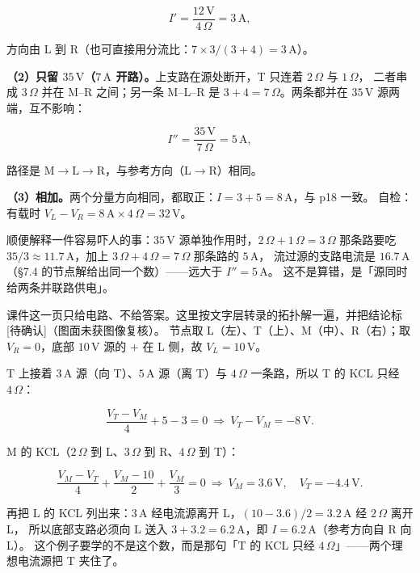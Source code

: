 \documentclass[11pt]{ctexart}
\begin{document}
\[ I'=\frac{12\,\mathrm{V}}{4\,\Omega}=3\,\mathrm{A} , \]

方向由 L 到 R（也可直接用分流比：$7\times3/(3+4)=3\,\mathrm{A}$）。

\textbf{（2）只留 $35\,\mathrm{V}$（$7\,\mathrm{A}$ 开路）。}上支路在源处断开，T 只连着 $2\,\Omega$ 与 $1\,\Omega$，
二者串成 $3\,\Omega$ 并在 M--R 之间；另一条 M--L--R 是 $3+4=7\,\Omega$。两条都并在 $35\,\mathrm{V}$ 源两端，互不影响：

\[ I''=\frac{35\,\mathrm{V}}{7\,\Omega}=5\,\mathrm{A} , \]

路径是 M$\to$L$\to$R，与参考方向（L$\to$R）相同。

\textbf{（3）相加。}两个分量方向相同，都取正：$I=3+5=8\,\mathrm{A}$，与 p18 一致。
自检：有载时 $V_L-V_R=8\,\mathrm{A}\times4\,\Omega=32\,\mathrm{V}$。

顺便解释一件容易吓人的事：$35\,\mathrm{V}$ 源单独作用时，$2\,\Omega+1\,\Omega=3\,\Omega$ 那条路要吃
$35/3\approx11.7\,\mathrm{A}$，加上 $3\,\Omega+4\,\Omega=7\,\Omega$ 那条路的 $5\,\mathrm{A}$，
流过源的支路电流是 $16.7\,\mathrm{A}$（§7.4 的节点解给出同一个数）——远大于 $I''=5\,\mathrm{A}$。
这不是算错，是「源同时给两条并联路供电」。


课件这一页只给电路、不给答案。这里按文字层转录的拓扑解一遍，并把结论标 [待确认]（图面未获图像复核）。
节点取 L（左）、T（上）、M（中）、R（右）；取 $V_R=0$，底部 $10\,\mathrm{V}$ 源的 $+$ 在 L 侧，故 $V_L=10\,\mathrm{V}$。

T 上接着 $3\,\mathrm{A}$ 源（向 T）、$5\,\mathrm{A}$ 源（离 T）与 $4\,\Omega$ 一条路，所以 T 的 KCL 只经 $4\,\Omega$：

\[ \frac{V_T-V_M}{4}+5-3=0\ \Longrightarrow\ V_T-V_M=-8\,\mathrm{V} . \]

M 的 KCL（$2\,\Omega$ 到 L、$3\,\Omega$ 到 R、$4\,\Omega$ 到 T）：

\[ \frac{V_M-V_T}{4}+\frac{V_M-10}{2}+\frac{V_M}{3}=0\ \Longrightarrow\ V_M=3.6\,\mathrm{V},\quad V_T=-4.4\,\mathrm{V} . \]

再把 L 的 KCL 列出来：$3\,\mathrm{A}$ 经电流源离开 L，$(10-3.6)/2=3.2\,\mathrm{A}$ 经 $2\,\Omega$ 离开 L，
所以底部支路必须向 L 送入 $3+3.2=6.2\,\mathrm{A}$，即 $I=6.2\,\mathrm{A}$（参考方向自 R 向 L）。
这个例子要学的不是这个数，而是那句「T 的 KCL 只经 $4\,\Omega$」——两个理想电流源把 T 夹住了。

\end{document}
